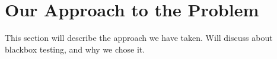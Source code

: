 \section[Approach]{Our Approach to the Problem}

This section will describe the approach we have taken. Will discuss about blackbox testing, and why we chose it.
